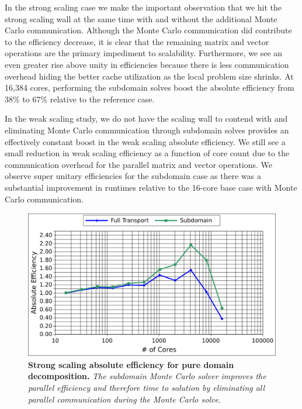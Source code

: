 In the strong scaling case we make the important observation that we
hit the strong scaling wall at the same time with and without the
additional Monte Carlo communication. Although the Monte Carlo
communication did contribute to the efficiency decrease, it is clear
that the remaining matrix and vector operations are the primary
impediment to scalability. Furthermore, we see an even greater rise
above unity in efficiencies because there is less communication
overhead hiding the better cache utilization as the local problem size
shrinks. At 16,384 cores, performing the subdomain solves boost the
absolute efficiency from 38\% to 67\% relative to the reference case.

In the weak scaling study, we do not have the scaling wall to contend
with and eliminating Monte Carlo communication through subdomain
solves provides an effectively constant boost in the weak scaling
absolute efficiency. We still see a small reduction in weak scaling
efficiency as a function of core count due to the communication
overhead for the parallel matrix and vector operations. We observe
super unitary efficiencies for the subdomain case as there was a
substantial improvement in runtimes relative to the 16-core base case
with Monte Carlo communication.

\begin{figure}[t!]
  \begin{center}
    \includegraphics[width=6in]{chapters/parallel_mc/titan_strong_subdomain.pdf}
  \end{center}
  \caption{\textbf{Strong scaling absolute efficiency for pure domain
      decomposition.} \textit{The subdomain Monte Carlo solver
      improves the parallel efficiency and therefore time to solution
      by eliminating all parallel communication during the Monte Carlo
      solve.}}
  \label{fig:titan_strong_subdomain}
\end{figure}

